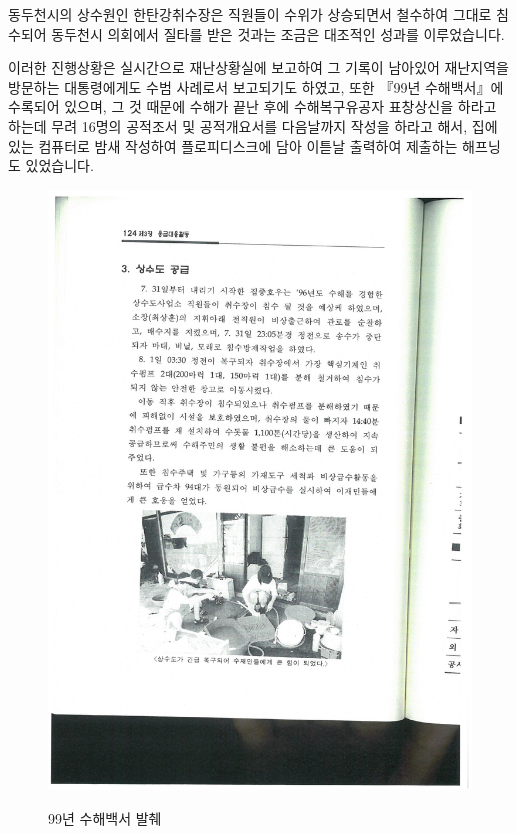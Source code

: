 \documentclass[chapter,book,openany,twoside]{oblivoir}
\begin{document}
동두천시의 상수원인 한탄강취수장은 직원들이 수위가 상승되면서 철수하여 그대로 침수되어 동두천시 의회에서 질타를 받은 것과는 조금은 대조적인 성과를 이루었습니다.


이러한 진행상황은 실시간으로 재난상황실에 보고하여 그 기록이 남아있어 재난지역을 방문하는 대통령에게도 수범 사례로서 보고되기도 하였고, 또한 『99년 수해백서』에 수록되어 있으며, 그 것 때문에 수해가 끝난 후에 수해복구유공자 표창상신을 하라고 하는데 무려 16명의 공적조서 및 공적개요서를 다음날까지 작성을 하라고 해서, 집에 있는 컴퓨터로 밤새 작성하여 플로피디스크에 담아 이튿날 출력하여 제출하는 해프닝도 있었습니다.

\begin{figure}[t]
\centering \includegraphics[scale=0.5]{DBs/pic/006.jpg}\\
\caption{99년 수해백서 발췌}
\end{figure}
\end{document}
